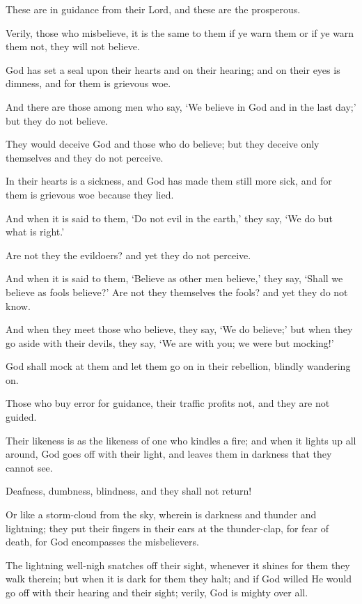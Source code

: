 \documentclass[fontsize=14pt, letterpaper, notitlepage, openany, DIV=12]{scrbook} %
\begin{document}
\noindent[2:5]
These are in guidance from their Lord, and these are the prosperous.

\noindent[2:6]
Verily, those who misbelieve, it is the same to them if ye warn them or if ye warn them
not, they will not believe.

\noindent[2:7]
God has set a seal upon their hearts and on their hearing; and on their eyes is dimness,
and for them is grievous woe.

\noindent[2:8]
And there are those among men who say, `We believe in God and in the last day;' but
they do not believe.

\noindent[2:9]
They would deceive God and those who do believe; but they deceive only themselves and
they do not perceive.

\noindent[2:10]
In their hearts is a sickness, and God has made them still more sick, and for them is
grievous woe because they lied.

\noindent[2:11]
And when it is said to them, `Do not evil in the earth,' they say, `We do but what is
right.'

\noindent[2:12]
Are not they the evildoers? and yet they do not perceive.

\noindent[2:13]
And when it is said to them, `Believe as other men believe,' they say, `Shall we believe
as fools believe?' Are not they themselves the fools? and yet they do not know.

\noindent[2:14]
And when they meet those who believe, they say, `We do believe;' but when they go
aside with their devils, they say, `We are with you; we were but mocking!'

\noindent[2:15]
God shall mock at them and let them go on in their rebellion, blindly wandering on.

\noindent[2:16]
Those who buy error for guidance, their traffic profits not, and they are not guided.

\noindent[2:17]
Their likeness is as the likeness of one who kindles a fire; and when it lights up all
around, God goes off with their light, and leaves them in darkness that they cannot see.

\noindent[2:18]
Deafness, dumbness, blindness, and they shall not return!

\noindent[2:19]
Or like a storm-cloud from the sky, wherein is darkness and thunder and lightning; they
put their fingers in their ears at the thunder-clap, for fear of death, for God encompasses the
misbelievers.

\noindent[2:20]
The lightning well-nigh snatches off their sight, whenever it shines for them they walk
therein; but when it is dark for them they halt; and if God willed He would go off with their
hearing and their sight; verily, God is mighty over all.
\end{document}
